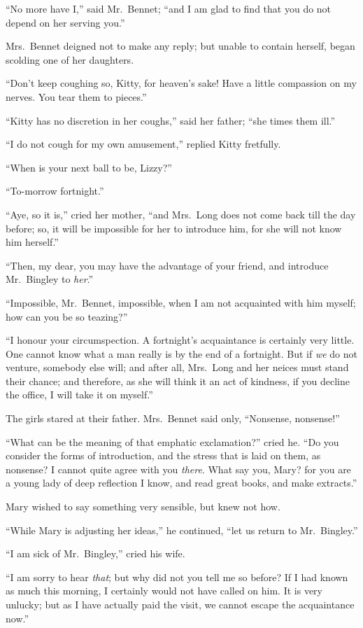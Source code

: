 “No more have I,” said Mr.\ Bennet; “and I am glad
to find that you do not depend on her serving you.”

Mrs.\ Bennet deigned not to make any reply; but
unable to contain herself, began scolding one of her
daughters.

“Don’t keep coughing so, Kitty, for heaven’s sake!
Have a little compassion on my nerves. You tear them
to pieces.”

“Kitty has no discretion in her coughs,” said her
father; “she times them ill.”

“I do not cough for my own amusement,” replied
Kitty fretfully.

“When is your next ball to be, Lizzy?”

“To-morrow fortnight.”

“Aye, so it is,” cried her mother, “and Mrs.\ Long
does not come back till the day before; so, it will be
impossible for her to introduce him, for she will not know
him herself.”

“Then, my dear, you may have the advantage of your
friend, and introduce Mr.\ Bingley to \textit{her}.”

“Impossible, Mr.\ Bennet, impossible, when I am
not acquainted with him myself; how can you be so
teazing?”

“I honour your circumspection. A fortnight’s acquaintance
is certainly very little. One cannot know what
a man really is by the end of a fortnight. But if \textit{we} do
not venture, somebody else will; and after all, Mrs.\ Long
and her neices must stand their chance; and therefore,
as she will think it an act of kindness, if you decline the
office, I will take it on myself.”

The girls stared at their father. Mrs.\ Bennet said only,
“Nonsense, nonsense!”

“What can be the meaning of that emphatic exclamation?”
cried he. “Do you consider the forms of introduction,
and the stress that is laid on them, as nonsense?
I cannot quite agree with you \textit{there}. What say you,
Mary? for you are a young lady of deep reflection I know,
and read great books, and make extracts.”

Mary wished to say something very sensible, but knew
not how.

“While Mary is adjusting her ideas,” he continued,
“let us return to Mr.\ Bingley.”

“I am sick of Mr.\ Bingley,” cried his wife.

“I am sorry to hear \textit{that}; but why did not you tell
me so before? If I had known as much this morning,
I certainly would not have called on him. It is very
unlucky; but as I have actually paid the visit, we cannot
escape the acquaintance now.”

